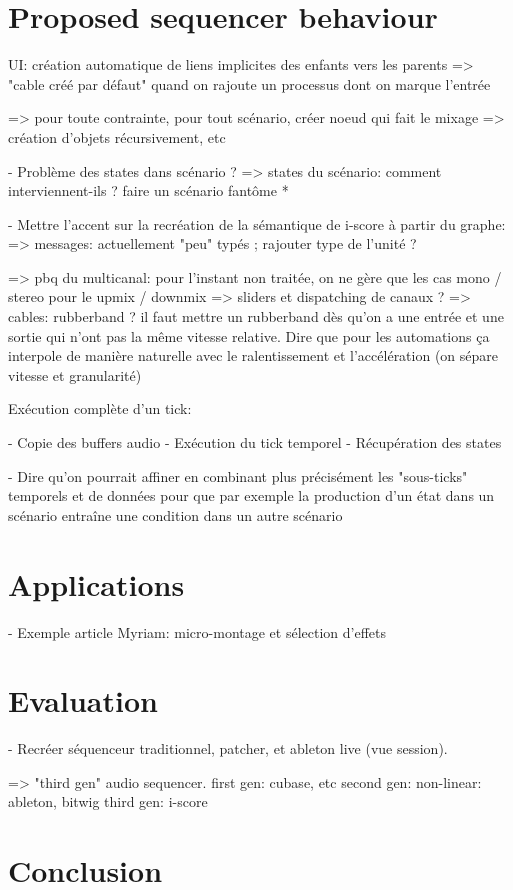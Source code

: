 \documentclass[a4paper]{article}
\begin{document}
\subsection{}

\section{Proposed sequencer behaviour}
UI: création automatique de liens implicites des enfants vers les parents
=> "cable créé par défaut" quand on rajoute un processus dont on marque l'entrée

=> pour toute contrainte, pour tout scénario, créer noeud qui fait le mixage
=> création d'objets récursivement, etc

- Problème des states dans scénario ?
=> states du scénario: comment interviennent-ils ? faire un scénario fantôme *


- Mettre l'accent sur la recréation de la sémantique de i-score à partir du graphe: 
=> messages: actuellement "peu" typés ; rajouter type de l'unité ? 

=> pbq du multicanal: pour l'instant non traitée, on ne gère que les cas mono / stereo pour le upmix / downmix
=> sliders et dispatching de canaux ?
=> cables: rubberband ? il faut mettre un rubberband dès qu'on a une entrée et une sortie qui n'ont pas la même vitesse relative. Dire que pour les automations ça interpole de manière naturelle avec le ralentissement et l'accélération (on sépare vitesse et granularité)

Exécution complète d'un tick: 

- Copie des buffers audio
- Exécution du tick temporel
- Récupération des states

- Dire qu'on pourrait affiner en combinant plus précisément les "sous-ticks" temporels et de données
pour que par exemple la production d'un état dans un scénario entraîne une condition dans un autre scénario


\section{Applications}
- Exemple article Myriam: micro-montage et sélection d'effets

\section{Evaluation}
- Recréer séquenceur traditionnel, patcher, et ableton live (vue session).

=> "third gen" audio sequencer.
first gen: cubase, etc
second gen: non-linear: ableton, bitwig
third gen: i-score

\section{Conclusion}
\end{document}
